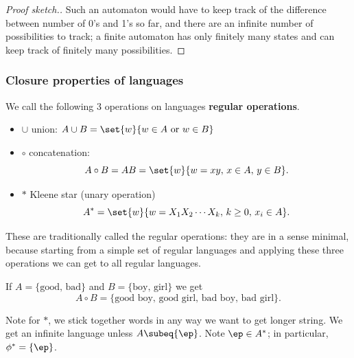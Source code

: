 \begin{proof}[Proof sketch.]
Such an automaton would have to keep track of the difference between number of 0's and 1's so far, and there are an infinite number of possibilities to track; a finite automaton has only finitely many states and can keep track of finitely many possibilities.
\end{proof}

\subsubsection{Closure properties of languages}

\begin{df}
We call the following 3 operations on languages \textbf{regular operations}.
\begin{itemize}
\item
$\cup$ union: $A\cup B=\set{w}{w\in A\text{ or }w\in B}$
\item
$\circ$ concatenation:
\[
A\circ B=AB=\set{w}{w=xy,\,x\in A,\, y\in B}.
\]
\item
$*$ Kleene star (unary operation) 
\[
A^*=\set{w}{w=X_1X_2\cdots X_k,\,k\ge 0,\,x_i\in A}.
\]
\end{itemize}
\end{df}%
These are traditionally called the regular operations: they are in a sense minimal, because starting from a simple set of regular languages and applying these three operations we can get to all regular languages. %

\begin{ex}
If $A=\{\text{good, bad}\}$ and $B=\{\text{boy, girl}\}$ we get
\[
A\circ B=\{\text{good boy, good girl, bad boy, bad girl}\}.
\]
\end{ex}
Note for $*$, we stick together words in any way we want to get longer string. We get an infinite language unless $A\subeq\{\ep\}$. Note $\ep\in A^*$; in particular, $\phi^*=\{\ep\}$.

